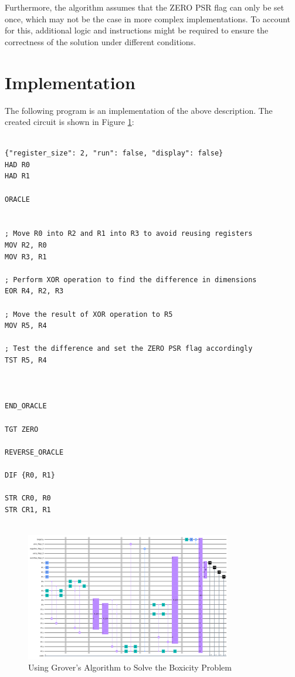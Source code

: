 Furthermore, the algorithm assumes that the ZERO PSR flag can only be set once, which may not be the case in more complex implementations. To account for this, additional logic and instructions might be required to ensure the correctness of the solution under different conditions.



\section{Implementation}

The following program is an implementation of the above description. The created circuit is shown in Figure \ref{fig:Boxicity}:

\begin{lstlisting}

{"register_size": 2, "run": false, "display": false}
HAD R0
HAD R1

ORACLE


; Move R0 into R2 and R1 into R3 to avoid reusing registers
MOV R2, R0
MOV R3, R1

; Perform XOR operation to find the difference in dimensions
EOR R4, R2, R3

; Move the result of XOR operation to R5
MOV R5, R4

; Test the difference and set the ZERO PSR flag accordingly
TST R5, R4



END_ORACLE

TGT ZERO

REVERSE_ORACLE

DIF {R0, R1}

STR CR0, R0
STR CR1, R1


\end{lstlisting}

\begin{figure}[htp]
    \centering
    \includegraphics[width=9cm]{Figures/Boxicity_circuit.png}
    \caption{Using Grover's Algorithm to Solve the Boxicity Problem}
    \label{fig:Boxicity}
\end{figure}

